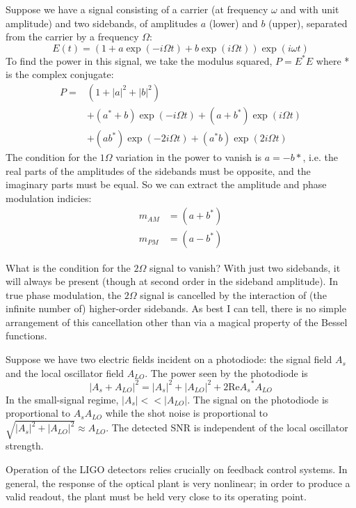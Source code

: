 \label{chapter7}
\onehalfspace
{}
\label{sec:am-vs-pm}
%
Suppose we have a signal consisting of a carrier (at frequency $\omega$ and
with unit amplitude) and two sidebands, of amplitudes $a$ (lower) and $b$
(upper), separated from the carrier by a frequency $\Omega$:
%
\begin{equation}
E(t) = \left(1 + a \exp(-i \Omega t) + b \exp(i \Omega t)\right)
\exp(i \omega t)
\end{equation}
%
To find the power in this signal, we take the
modulus squared, $P = E^*E$ where * is the complex conjugate:
%
\begin{equation}
\begin{split}
P = & \left(1 + |a|^2 + |b|^2\right) \\
    & + \left(a^* + b\right) \exp(-i \Omega t) + \left(a + b^*\right) \exp(i \Omega t) \\
    & + \left(ab^*\right) \exp(-2 i \Omega t) + \left(a^*b\right) \exp(2 i \Omega t)
\end{split}
\end{equation}
%
The condition for the $1\Omega$ variation in the power to vanish is
$a=-b*$, i.e. the real parts of the amplitudes of the sidebands must
be opposite, and the imaginary parts must be equal. So we can extract
the amplitude and phase modulation indicies:
%
\begin{equation}
\begin{split}
m_{AM} &= (a + b^*)\\
m_{PM} &= (a - b^*)
\end{split}
\end{equation}

What is the condition for the $2\Omega$ signal to vanish? With just
two sidebands, it will always be present (though at second order in
the sideband amplitude). In true phase modulation, the $2\Omega$
signal is cancelled by the interaction of (the infinite number of)
higher-order sidebands. As best I can tell, there is no simple
arrangement of this cancellation other than via a magical property of
the Bessel functions.


Suppose we have two electric fields incident on a photodiode: the
signal field $A_s$ and the local oscillator field $A_{LO}$.  The power
seen by the photodiode is
$$ \left| A_s + A_{LO} \right|^2 = 
   |A_s|^2 + |A_{LO}|^2 + 2 \mathrm{ Re } {A_s}^*A_{LO}$$
In the small-signal regime, $|A_s| << |A_{LO}|$.  The signal on the
photodiode is proportional to $A_s A_{LO}$ while the shot noise is
proportional to $\sqrt{|A_s|^2+|A_{LO}|^2}\approx A_{LO}$.  
  The detected SNR is independent of the local oscillator strength.


Operation of the LIGO detectors relies crucially on feedback control
systems.  In general, the response of the optical plant is very
nonlinear; in order to produce a valid readout, the plant must be held
very close to its operating point.

\cite{Quetschke2007Complex}
